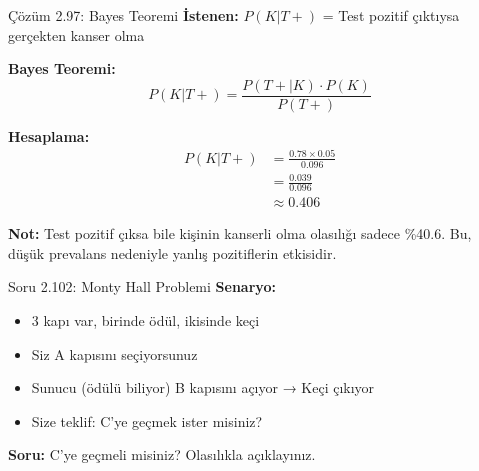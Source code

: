 \documentclass[light]{lutbeamer}
\begin{document}
\begin{frame}{Çözüm 2.97: Bayes Teoremi}
    \color{blue}
    \textbf{İstenen:} $P(K|T+)$ = Test pozitif çıktıysa gerçekten kanser olma
    
    \vspace{0.3cm}
    \textbf{Bayes Teoremi:}
    \[ P(K|T+) = \frac{P(T+|K) \cdot P(K)}{P(T+)} \]
    
    \vspace{0.3cm}
    \textbf{Hesaplama:}
    \begin{align*}
    P(K|T+) &= \frac{0.78 \times 0.05}{0.096} \\
            &= \frac{0.039}{0.096} \\
            &\approx 0.406
    \end{align*}
    
    \begin{center}
    \end{center}
    
    \vspace{0.2cm}
    \footnotesize
    \textbf{Not:} Test pozitif çıksa bile kişinin kanserli olma olasılığı sadece \%40.6. Bu, düşük prevalans nedeniyle yanlış pozitiflerin etkisidir.
\end{frame}

\begin{frame}{Soru 2.102: Monty Hall Problemi}
    \textbf{Senaryo:}
    \begin{itemize}
        \item 3 kapı var, birinde ödül, ikisinde keçi
        \item Siz A kapısını seçiyorsunuz
        \item Sunucu (ödülü biliyor) B kapısını açıyor → Keçi çıkıyor
        \item Size teklif: C'ye geçmek ister misiniz?
    \end{itemize}
    
    \textbf{Soru:} C'ye geçmeli misiniz? Olasılıkla açıklayınız.
\end{frame}
\end{document}
